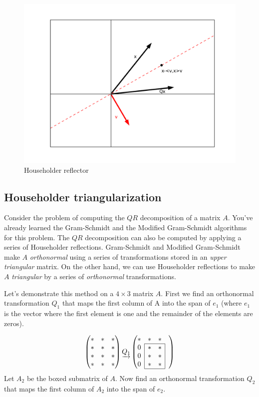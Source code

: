 \begin{figure}
\includegraphics[width= \textwidth]{fig1}
\caption{Householder reflector}
\label{fig:Householder_reflector}
\end{figure}

\subsection*{Householder triangularization}
Consider the problem of computing the $QR$ decomposition of a matrix $A$.
You've already learned the Gram-Schmidt and the Modified Gram-Schmidt algorithms for this problem.
The $QR$ decomposition can also be computed by applying a series of Householder reflections.
Gram-Schmidt and Modified Gram-Schmidt make $A$ \emph{orthonormal} using a series of transformations stored in an \emph{upper triangular} matrix.
On the other hand, we can use Householder reflections to make $A$ \emph{triangular} by a series of \emph{orthonormal} transformations.

Let's demonstrate this method on a $4 \times 3$ matrix $A$.
First we find an orthonormal transformation $Q_1$ that maps the first column of A into the span of $e_1$
(where $e_1$ is the vector where the first element is one and the remainder of the elements are zeros).

\def\mc#1{\multicolumn{1}{c|}{#1}}
\begin{equation*}
\begin{pmatrix}
* & * & * \\
* & * & * \\
* & * & * \\
* & * & *
\end{pmatrix}
\underrightarrow{Q_1}
\begin{pmatrix}

* & * & * & \\ \cline{2-3}
\mc{0} & * & \mc{*}& \\
\mc{0} & * & \mc{*} & \\
\mc{0}& * & \mc{*} & \\ \cline{2-3}
\end{pmatrix}
\end{equation*}
Let $A_2$ be the boxed submatrix of $A$.
Now find an orthonormal transformation $Q_2$ that maps the first column of $A_2$ into the span of $e_2$.

